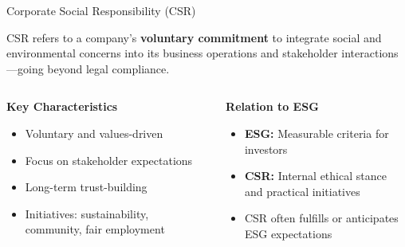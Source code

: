 \documentclass[aspectratio=169, 10pt]{beamer}
\begin{document}
\begin{frame}[t]{Corporate Social Responsibility (CSR)}

\begin{tcolorbox}[colback=WHUblue!5!white, colframe=WHUblue, title=Definition, fonttitle=\bfseries, sharp corners=south]
CSR refers to a company's \textbf{voluntary commitment} to integrate social and environmental concerns into its business operations and stakeholder interactions—going beyond legal compliance.
\end{tcolorbox}

\vspace{0.8em}

\begin{columns}[T,onlytextwidth]
  \begin{column}{0.48\textwidth}
    \textcolor{WHUblue}{\textbf{Key Characteristics}}
    \begin{itemize}
      \item Voluntary and values-driven
      \item Focus on stakeholder expectations
      \item Long-term trust-building
      \item Initiatives: sustainability, community, fair employment
    \end{itemize}
  \end{column}
  \begin{column}{0.04\textwidth}
    \hfill
  \end{column}
  \begin{column}{0.48\textwidth}
    \textcolor{WHUblue}{\textbf{Relation to ESG}}
    \begin{itemize}
      \item \textbf{ESG:} Measurable criteria for investors
      \item \textbf{CSR:} Internal ethical stance and practical initiatives
      \item CSR often fulfills or anticipates ESG expectations
    \end{itemize}
  \end{column}
\end{columns}

\vspace{0.8em}


\hfill{}
\end{frame}
\end{document}
